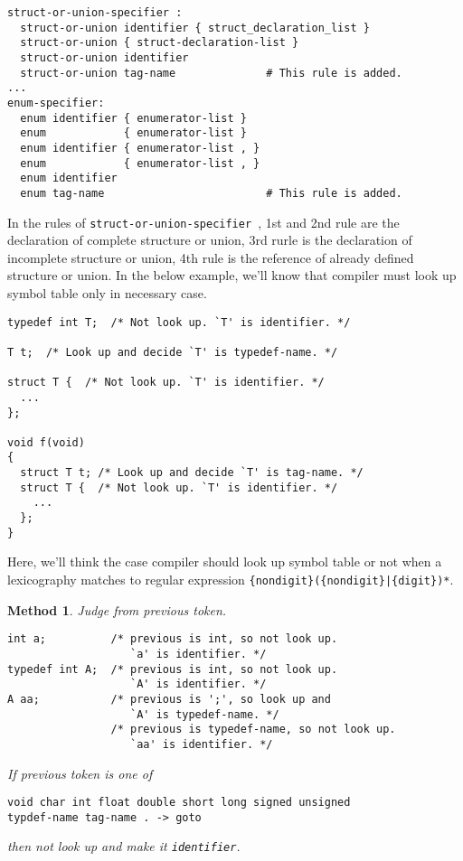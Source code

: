 \begin{verbatim}
struct-or-union-specifier :
  struct-or-union identifier { struct_declaration_list }
  struct-or-union { struct-declaration-list }
  struct-or-union identifier
  struct-or-union tag-name              # This rule is added.
...
enum-specifier:
  enum identifier { enumerator-list }
  enum            { enumerator-list }
  enum identifier { enumerator-list , }
  enum            { enumerator-list , }
  enum identifier
  enum tag-name                         # This rule is added.
\end{verbatim}
In the rules of {\tt struct-or-union-specifier },
1st and 2nd rule are the declaration of complete structure or union,
3rd rurle is the declaration of incomplete structure or union,
4th rule is the reference of already defined structure or union.
In the below example, we'll know that compiler must look up
symbol table only in necessary case.
\begin{verbatim}
typedef int T;  /* Not look up. `T' is identifier. */

T t;  /* Look up and decide `T' is typedef-name. */

struct T {  /* Not look up. `T' is identifier. */
  ...
};

void f(void)
{
  struct T t; /* Look up and decide `T' is tag-name. */
  struct T {  /* Not look up. `T' is identifier. */ 
    ...
  };
}
\end{verbatim}
Here, we'll think the case compiler should look up symbol table
or not when a lexicography matches to regular expression
{\tt \{nondigit\}(\{nondigit\}|\{digit\})*}.

\newtheorem{Method}{Method}[chapter]

\begin{Method}
\label{lex_yacc_e002}
Judge from previous token.

\begin{verbatim}
int a;          /* previous is int, so not look up.
                   `a' is identifier. */
typedef int A;  /* previous is int, so not look up.
                   `A' is identifier. */
A aa;           /* previous is ';', so look up and
                   `A' is typedef-name. */
                /* previous is typedef-name, so not look up.
                   `aa' is identifier. */
\end{verbatim}

If previous token is one of
\begin{verbatim}
void char int float double short long signed unsigned
typdef-name tag-name . -> goto
\end{verbatim}
then not look up and make it  {\tt{identifier}}.
\end{Method}

